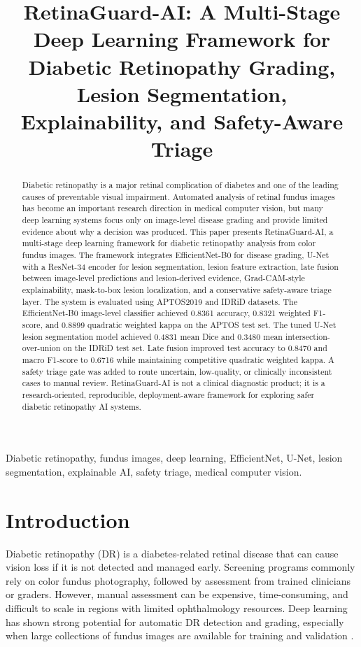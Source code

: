 \documentclass[conference]{IEEEtran}
\title{RetinaGuard-AI: A Multi-Stage Deep Learning Framework for Diabetic Retinopathy Grading, Lesion Segmentation, Explainability, and Safety-Aware Triage}
\author{
\IEEEauthorblockN{Mahmoud Maher El-Said}
\IEEEauthorblockA{
Artificial Intelligence -- Intelligent Systems\\
Arab Academy for Science, Technology and Maritime Transport\\
Damietta, Egypt\\
Email: mahmoud.maher.elsaid@outlook.com
}
}
\begin{document}
\maketitle

\begin{abstract}
Diabetic retinopathy is a major retinal complication of diabetes and one of the leading causes of preventable visual impairment. Automated analysis of retinal fundus images has become an important research direction in medical computer vision, but many deep learning systems focus only on image-level disease grading and provide limited evidence about why a decision was produced. This paper presents RetinaGuard-AI, a multi-stage deep learning framework for diabetic retinopathy analysis from color fundus images. The framework integrates EfficientNet-B0 for disease grading, U-Net with a ResNet-34 encoder for lesion segmentation, lesion feature extraction, late fusion between image-level predictions and lesion-derived evidence, Grad-CAM-style explainability, mask-to-box lesion localization, and a conservative safety-aware triage layer. The system is evaluated using APTOS2019 and IDRiD datasets. The EfficientNet-B0 image-level classifier achieved 0.8361 accuracy, 0.8321 weighted F1-score, and 0.8899 quadratic weighted kappa on the APTOS test set. The tuned U-Net lesion segmentation model achieved 0.4831 mean Dice and 0.3480 mean intersection-over-union on the IDRiD test set. Late fusion improved test accuracy to 0.8470 and macro F1-score to 0.6716 while maintaining competitive quadratic weighted kappa. A safety triage gate was added to route uncertain, low-quality, or clinically inconsistent cases to manual review. RetinaGuard-AI is not a clinical diagnostic product; it is a research-oriented, reproducible, deployment-aware framework for exploring safer diabetic retinopathy AI systems.
\end{abstract}

\begin{IEEEkeywords}
Diabetic retinopathy, fundus images, deep learning, EfficientNet, U-Net, lesion segmentation, explainable AI, safety triage, medical computer vision.
\end{IEEEkeywords}

\section{Introduction}
Diabetic retinopathy (DR) is a diabetes-related retinal disease that can cause vision loss if it is not detected and managed early. Screening programs commonly rely on color fundus photography, followed by assessment from trained clinicians or graders. However, manual assessment can be expensive, time-consuming, and difficult to scale in regions with limited ophthalmology resources. Deep learning has shown strong potential for automatic DR detection and grading, especially when large collections of fundus images are available for training and validation \cite{gulshan2016dr}.
\end{document}
